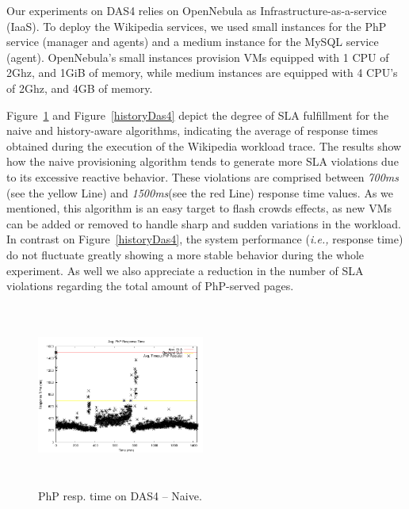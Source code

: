 Our experiments on DAS4 relies on OpenNebula as Infrastructure-as-a-service (IaaS). To deploy the Wikipedia services, we used small instances for the PhP service (manager and agents) and a medium instance for the MySQL service (agent). OpenNebula's small instances provision VMs equipped with 1 CPU of 2Ghz, and 1GiB of memory, while medium instances are equipped with 4 CPU's of 2Ghz, and 4GB of memory.

Figure~\ref{naiveDas4} and Figure~\ref{historyDas4} depict the degree of SLA fulfillment for the naive and history-aware algorithms, indicating the average of response times obtained during the execution of the Wikipedia workload trace. The results show how the naive provisioning algorithm tends to generate more SLA violations due to its excessive reactive behavior. These violations are comprised between \emph{700ms} (see the yellow Line) and \emph{1500ms}(see the red Line) response time values. As we mentioned, this algorithm is an easy target to flash crowds effects, as new VMs can be added or removed  to handle sharp and sudden variations in the workload. In contrast on Figure~\ref{historyDas4}, the system performance (\emph{i.e.,} response time) do not fluctuate greatly showing a more stable behavior during the whole experiment. As well we also appreciate a reduction in the number of SLA violations regarding the total amount of PhP-served pages.


\begin{figure}

\begin{center}
\includegraphics[width=0.49\textwidth, height=6cm]{./images/homogeneous/avgTimeout_PhP_naive}
\end{center}
\caption{PhP resp. time on DAS4 -- Naive.}
\label{naiveDas4}
\end{figure}

